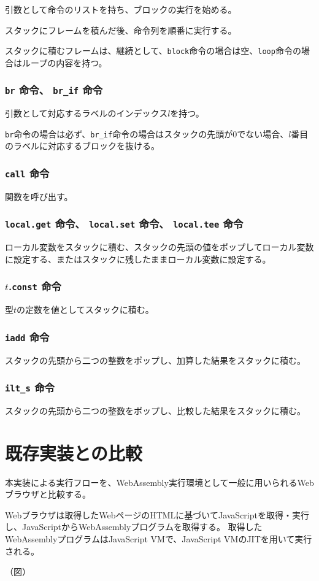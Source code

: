 引数として命令のリストを持ち、ブロックの実行を始める。

スタックにフレームを積んだ後、命令列を順番に実行する。

スタックに積むフレームは、継続として、\verb|block|命令の場合は空、\verb|loop|命令の場合はループの内容を持つ。

\subsubsection{{\tt br} 命令、 {\tt br\_if} 命令}

引数として対応するラベルのインデックス$l$を持つ。

\verb|br|命令の場合は必ず、\verb|br_if|命令の場合はスタックの先頭が0でない場合、$l$番目のラベルに対応するブロックを抜ける。

\subsubsection{{\tt call} 命令}

関数を呼び出す。

\subsubsection{{\tt local.get} 命令、 {\tt local.set} 命令、 {\tt local.tee} 命令}

ローカル変数をスタックに積む、スタックの先頭の値をポップしてローカル変数に設定する、またはスタックに残したままローカル変数に設定する。

\subsubsection{$t$.{\tt const} 命令}

型$t$の定数を値としてスタックに積む。

\subsubsection{{\tt iadd} 命令}

スタックの先頭から二つの整数をポップし、加算した結果をスタックに積む。

\subsubsection{{\tt ilt\_s} 命令}

スタックの先頭から二つの整数をポップし、比較した結果をスタックに積む。

\section{既存実装との比較}

本実装による実行フローを、WebAssembly実行環境として一般に用いられるWebブラウザと比較する。

Webブラウザは取得したWebページのHTMLに基づいてJavaScriptを取得・実行し、JavaScriptからWebAssemblyプログラムを取得する。
取得したWebAssemblyプログラムはJavaScript VMで、JavaScript VMのJITを用いて実行される。

（図）
